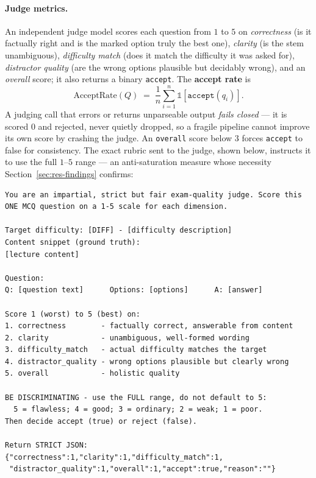 \paragraph{Judge metrics.} An independent judge model scores each question from $1$
to $5$ on \emph{correctness} (is it factually right and is the marked option truly
the best one), \emph{clarity} (is the stem unambiguous), \emph{difficulty match}
(does it match the difficulty it was asked for), \emph{distractor quality} (are the
wrong options plausible but decidably wrong), and an \emph{overall} score; it also
returns a binary \texttt{accept}. The \textbf{accept rate} is
\begin{equation}
\mathrm{AcceptRate}(Q) \;=\; \frac{1}{n}\sum_{i=1}^{n}\mathbb{1}[\texttt{accept}(q_i)] .
\end{equation}
A judging call that errors or returns unparseable output \emph{fails closed} --- it
is scored $0$ and rejected, never quietly dropped, so a fragile pipeline cannot
improve its own score by crashing the judge. An \texttt{overall} score below $3$
forces \texttt{accept} to false for consistency. The exact rubric sent to the
judge, shown below, instructs it to use the full $1$--$5$ range --- an
anti-saturation measure whose necessity Section~\ref{sec:res-findings}
confirms:

\begin{verbatim}
You are an impartial, strict but fair exam-quality judge. Score this
ONE MCQ question on a 1-5 scale for each dimension.

Target difficulty: [DIFF] - [difficulty description]
Content snippet (ground truth):
[lecture content]

Question:
Q: [question text]      Options: [options]      A: [answer]

Score 1 (worst) to 5 (best) on:
1. correctness        - factually correct, answerable from content
2. clarity            - unambiguous, well-formed wording
3. difficulty_match   - actual difficulty matches the target
4. distractor_quality - wrong options plausible but clearly wrong
5. overall            - holistic quality

BE DISCRIMINATING - use the FULL range, do not default to 5:
  5 = flawless; 4 = good; 3 = ordinary; 2 = weak; 1 = poor.
Then decide accept (true) or reject (false).

Return STRICT JSON:
{"correctness":1,"clarity":1,"difficulty_match":1,
 "distractor_quality":1,"overall":1,"accept":true,"reason":""}
\end{verbatim}

